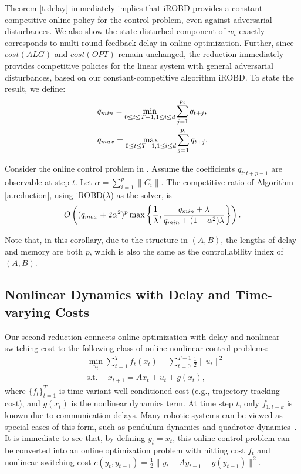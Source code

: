 Theorem \ref{t.delay} immediately implies that iROBD provides a constant-competitive online policy for the control problem, even against adversarial disturbances. We also show the state disturbed component of $w_t$ exactly corresponds to multi-round feedback delay in online optimization.  Further, since $cost(ALG)$ and $cost(OPT)$ remain unchanged, the reduction immediately provides competitive policies for the linear system with general adversarial disturbances, based on our constant-competitive algorithm iROBD. To state the result, we define:
\begin{align}
    &q_{min}=\min_{0\le t\le T-1,1\le i\le d}\sum_{j=1}^{p_i}q_{t+j},\notag\\
    &q_{max}=\max_{0\le t\le T-1,1\le i\le d}\sum_{j=1}^{p_i}q_{t+j}.\notag
\end{align}

\begin{corollary}
Consider the online control problem in . Assume the coefficients $q_{t:t+p-1}$ are observable at step $t$. Let $\alpha=\sum_{i=1}^p\|{C_i}\|$. The competitive ratio of Algorithm \ref{a.reduction}, using iROBD($\lambda$) as the solver, is
\begin{align}
    O\left((q_{max}+2\alpha^2)^p\max\left\{\frac{1}{\lambda},\frac{q_{min}+\lambda}{q_{min}+(1-\alpha^2)\lambda}\right\}\right).\notag
\end{align}
\end{corollary}

Note that, in this corollary, due to the structure in $(A,B)$, the lengths of delay and memory are both $p$, which is also the same as the controllability index of $(A,B)$. 

\subsection{Nonlinear Dynamics with Delay and Time-varying Costs}

Our second reduction connects online optimization with delay and nonlinear switching cost to the following class of online nonlinear control problems:
\begin{equation}
\label{eq:example-2}
\begin{aligned}
    &\min_{u_t}\sum_{t=1}^{T} f_t(x_t) + \sum_{t=0}^{T-1}\frac{1}{2}\|u_t\|^2 \\
    &\mathrm{s.t.~}\quad x_{t+1}=Ax_t+u_t+g(x_t),
\end{aligned}    
\end{equation}
where $\{f_t\}_{t=1}^T$ is time-variant well-conditioned cost (e.g., trajectory tracking cost), and $g(x_t)$ is the nonlinear dynamics term. At time step $t$, only $f_{1:t-k}$ is known due to communication delays. Many robotic systems can be viewed as special cases of this form, such as pendulum dynamics and quadrotor dynamics~\citep{shi2019neural}. It is immediate to see that, by defining $y_t=x_t$, this online control problem can be converted into an online optimization problem with hitting cost $f_t$ and nonlinear switching cost $c(y_t,y_{t-1})=\frac{1}{2}\|y_t-Ay_{t-1}-g(y_{t-1})\|^2$. 

